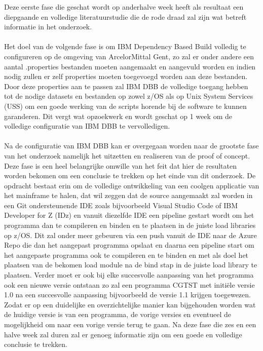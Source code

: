Deze eerste fase die geschat wordt op anderhalve week heeft als resultaat een diepgaande en volledige literatuurstudie die de rode draad zal zijn wat betreft informatie in het onderzoek. 
\\ \\
Het doel van de volgende fase is om IBM Dependency Based Build volledig te configureren op de omgeving van ArcelorMittal Gent, 
zo zal er onder andere een aantal .properties bestanden moeten aangemaakt en aangevuld worden en indien nodig zullen er zelf properties moeten toegevoegd worden aan deze bestanden.
Door deze properties aan te passen zal IBM DBB de volledige toegang hebben tot de nodige datasets en bestanden op zowel z/OS als op Unix System Services (USS) om een goede werking van de scripts horende bij de software te kunnen garanderen.
Dit vergt wat opzoekwerk en wordt geschat op 1 week om de volledige configuratie van IBM DBB te vervolledigen. 
\\ \\
Na de configuratie van IBM DBB kan er overgegaan worden naar de grootste fase van het onderzoek namelijk het uitzetten en realiseren van de proof of concept.
Deze fase is een heel belangrijke omwille van het feit dat hier de resultaten worden bekomen om een conclusie te trekken op het einde van dit onderzoek. 
De opdracht bestaat erin om de volledige ontwikkeling van een coolgen applicatie van het mainframe te halen, 
dat wil zeggen dat de source aangemaakt zal worden in een Git ondersteunende IDE zoals bijvoorbeeld Visual Studio Code of IBM Developer for Z (IDz) en vanuit diezelfde IDE een pipeline 
gestart wordt om het programma dan te compileren en binden en te plaatsen in de juiste load libraries op z/OS.
Dit zal onder meer gebeuren via een push vanuit de IDE naar de Azure Repo die dan het aangepast programma opslaat en daarna een pipeline start om het aangepaste programma ook 
te compileren en te binden en met als doel het plaatsen van de bekomen load module na de bind stap in de juiste load library te plaatsen.
Verder moet er ook bij elke succesvolle aanpassing van het programma ook een nieuwe versie ontstaan zo zal een programma CGTST met initiële versie 1.0 na een succesvolle 
aanpassing bijvoorbeeld de versie 1.1 krijgen toegewezen. 
Zodat er op een duidelijke en overzichtelijke manier kan bijgehouden worden wat de huidige versie is van een programma, de vorige versies en eventueel de mogelijkheid om naar een vorige versie terug te gaan.
Na deze fase die zes en een halve week zal duren zal er genoeg informatie zijn om een goede en volledige conclusie te trekken. 
